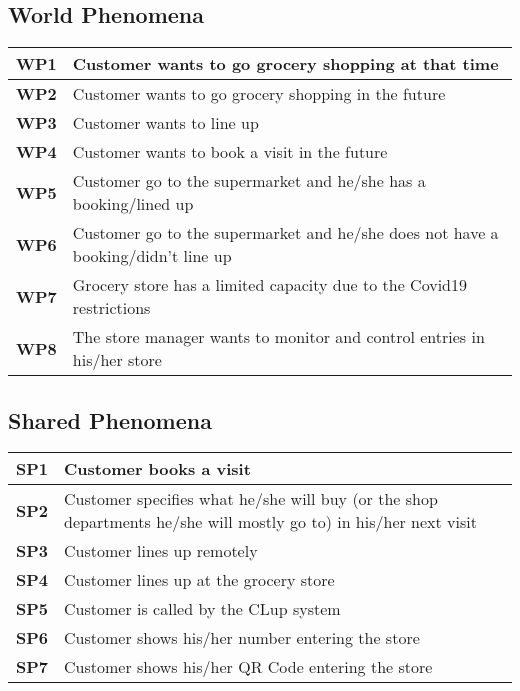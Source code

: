 \subsection{World Phenomena} %
\begin{center}
    {\renewcommand{\arraystretch}{2.4}%
    \begin{tabular}{L{2cm}L{14cm}}
        \hline
        \textbf{WP1} & Customer wants to go grocery shopping at that time \\
        \hline
        \textbf{WP2} & Customer wants to go grocery shopping in the future \\
        \hline
        \textbf{WP3} & Customer wants to line up \\
        \hline
        \textbf{WP4} & Customer wants to book a visit in the future \\
        \hline
        \textbf{WP5} & Customer go to the supermarket and he/she has a booking/lined up \\
        \hline
        \textbf{WP6} & Customer go to the supermarket and he/she does not have a booking/didn't line up \\
        \hline
        \textbf{WP7} & Grocery store has a limited capacity due to the Covid19 restrictions \\
        \hline
        \textbf{WP8} & The store manager wants to monitor and control entries in his/her store \\
        \hline
    \end{tabular}}
\end{center}

\subsection{Shared Phenomena}
\begin{center}
    {\renewcommand{\arraystretch}{2.4}%
    \begin{tabular}{L{2cm}L{14cm}}
        \hline
        \textbf{SP1} & Customer books a visit \\
        \hline
        \textbf{SP2} & Customer specifies what he/she will buy (or the shop departments he/she will mostly go to) in his/her next visit \\
        \hline
        \textbf{SP3} & Customer lines up remotely \\
        \hline
        \textbf{SP4} & Customer lines up at the grocery store \\
        \hline
        \textbf{SP5} & Customer is called by the CLup system \\
        \hline
        \textbf{SP6} & Customer shows his/her number entering the store \\
        \hline
        \textbf{SP7} & Customer shows his/her QR Code entering the store \\
        \hline
    \end{tabular}}
\end{center}

